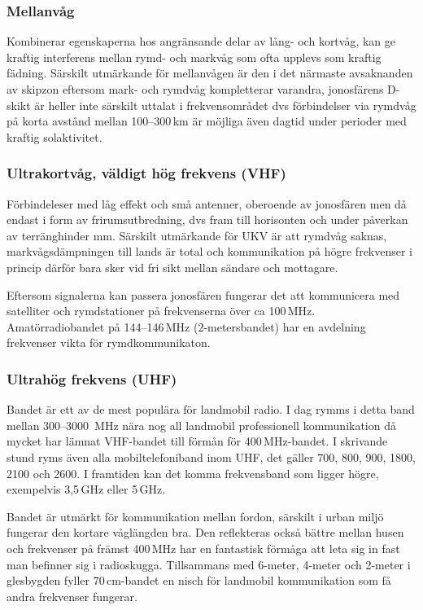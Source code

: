 \subsubsection{Mellanvåg}

Kombinerar egenskaperna hos angränsande delar av lång- och kortvåg, kan ge
kraftig interferens mellan rymd- och markvåg som ofta upplevs som kraftig
fädning. Särskilt utmärkande för mellanvågen är den i det närmaste avsaknanden
av skipzon eftersom mark- och rymdvåg kompletterar varandra, jonosfärens D-skikt
är heller inte särskilt uttalat i frekvensområdet dvs förbindelser via rymdvåg
på korta avstånd mellan 100--300\,km är möjliga även dagtid under perioder med
kraftig solaktivitet.

\subsubsection{Ultrakortvåg, väldigt hög frekvens (VHF)}

Förbindeleser med låg effekt och små antenner, oberoende av jonosfären men då
endast i form av frirumsutbredning, dvs fram till horisonten och under påverkan
av terränghinder mm. Särskilt utmärkande för UKV är att rymdvåg saknas,
markvågsdämpningen till lands är total och kommunikation på högre frekvenser i
princip därför bara sker vid fri sikt mellan sändare och mottagare.

Eftersom signalerna kan passera jonosfären fungerar det att kommunicera med
satelliter och rymdstationer på frekvenserna över ca 100\,MHz. Amatörradiobandet
på 144--146\,MHz (2-metersbandet) har en avdelning frekvenser vikta för
rymdkommunikaton.

\subsubsection{Ultrahög frekvens (UHF)}

Bandet är ett av de mest populära för landmobil radio. I dag rymms i detta band
mellan 300--3000\- \,MHz nära nog all landmobil professionell kommunikation då
mycket har lämnat VHF-bandet till förmån för 400\,MHz-bandet. I skrivande stund
ryms även alla mobiltelefoniband inom UHF, det gäller 700, 800, 900, 1800, 2100
och 2600. I framtiden kan det komma frekvensband som ligger högre, exempelvis
3,5\,GHz eller 5\,GHz.

Bandet är utmärkt för kommunikation mellan fordon, särskilt i urban miljö
fungerar den kortare våglängden bra. Den reflekteras också bättre mellan husen
och frekvenser på främst 400\,MHz har en fantastisk förmåga att leta sig in fast
man befinner sig i radioskugga. Tillsammans med 6-meter, 4-meter och 2-meter i
glesbygden fyller 70\,cm-bandet en nisch för landmobil kommunikation som få
andra frekvenser fungerar.

